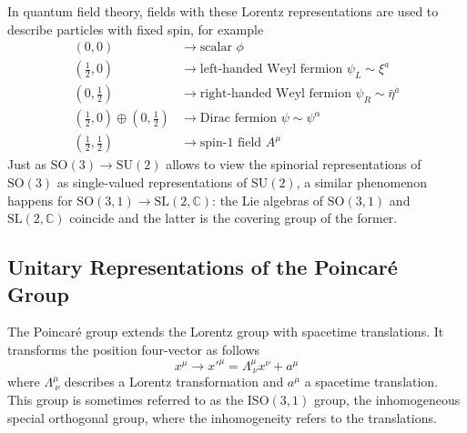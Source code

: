 In quantum field theory, fields with these Lorentz representations are used to describe particles with fixed spin, for example
\[
    \begin{aligned}
        (0, 0)                                                           & \longrightarrow \text{scalar } \phi                                                \\
        \left(\tfrac{1}{2}, 0\right)                                     & \longrightarrow \text{left-handed Weyl fermion } \psi_L \sim \xi^a                 \\
        \left(0, \tfrac{1}{2}\right)                                     & \longrightarrow \text{right-handed Weyl fermion } \psi_R \sim \bar{\eta}^{\dot{a}} \\
        \left(\tfrac{1}{2}, 0\right) \oplus \left(0, \tfrac{1}{2}\right) & \longrightarrow \text{Dirac fermion } \psi \sim \psi^\alpha                        \\
        \left(\tfrac{1}{2}, \tfrac{1}{2}\right)                          & \longrightarrow \text{spin-1 field } A^\mu
    \end{aligned}
\]
Just as $\mathrm{SO}(3) \rightarrow \mathrm{SU}(2)$ allows to view the spinorial representations of $\mathrm{SO}(3)$ as single-valued representations of $\mathrm{SU}(2)$, a similar phenomenon happens for $\mathrm{SO}(3,1) \rightarrow \mathrm{SL}(2,\mathbb{C})$: the Lie algebras of $\mathrm{SO}(3,1)$ and $\mathrm{SL}(2,\mathbb{C})$ coincide and the latter is the covering group of the former.

\subsection{Unitary Representations of the Poincaré Group}

The Poincaré group extends the Lorentz group with spacetime translations. It transforms the position four-vector as follows
\[
    x^\mu \rightarrow x'^\mu = \Lambda^\mu_{\ \nu} x^\nu + a^\mu
\]
where $\Lambda^\mu_{\ \nu}$ describes a Lorentz transformation and $a^\mu$ a spacetime translation. This group is sometimes referred to as the $\mathrm{ISO}(3,1)$ group, the inhomogeneous special orthogonal group, where the inhomogeneity refers to the translations.

